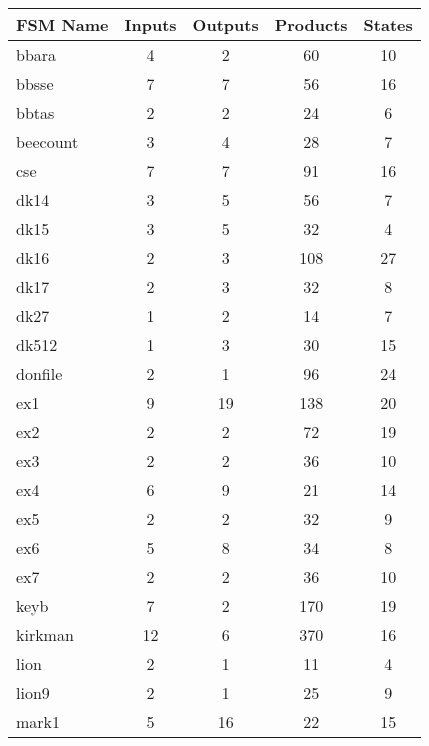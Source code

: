 {\begin{pespace}
\begin{center}
\begin{tabular}{|l|c|c|c|c|}
\hline
FSM Name   &    Inputs   &  Outputs   &  Products  &  States\\
\hline
bbara      &         4   &      2     &     60     &     10\\
bbsse      &         7   &      7     &     56     &     16\\
bbtas      &         2   &      2     &     24     &      6\\
beecount   &         3   &      4     &     28     &      7\\
cse        &         7   &      7     &     91     &     16\\
dk14       &         3   &      5     &     56     &      7\\
dk15       &         3   &      5     &     32     &      4\\
dk16       &         2   &      3     &    108     &     27\\
dk17       &         2   &      3     &     32     &      8\\
dk27       &         1   &      2     &     14     &      7\\
dk512      &         1   &      3     &     30     &     15\\
donfile    &         2   &      1     &     96     &     24\\
ex1        &         9   &     19     &    138     &     20\\
ex2        &         2   &      2     &     72     &     19\\
ex3        &         2   &      2     &     36     &     10\\
ex4        &         6   &      9     &     21     &     14\\
ex5        &         2   &      2     &     32     &      9\\
ex6        &         5   &      8     &     34     &      8\\
ex7        &         2   &      2     &     36     &     10\\
keyb       &         7   &      2     &    170     &     19\\
kirkman    &        12   &      6     &    370     &     16\\
lion       &         2   &      1     &     11     &      4\\
lion9      &         2   &      1     &     25     &      9\\
mark1      &         5   &     16     &     22     &     15\\

\end{tabular}
\end{center}
\end{pespace}}
